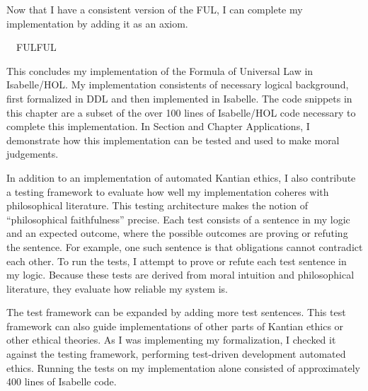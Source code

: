 \begin{isabellebody}
\begin{isamarkuptext}
Now that I have a consistent version of the FUL, I can complete my implementation by adding it as an axiom.%
\end{isamarkuptext}\isamarkuptrue%
\isamarkupfalse%
\ \ FUL{\isacharcolon}FUL%
\begin{isamarkuptext}%
This concludes my implementation of the Formula of Universal Law in Isabelle/HOL. My implementation
consistents of necessary logical background, first formalized in DDL and then implemented in Isabelle.
The code snippets in this chapter are a subset of the over 100 lines of Isabelle/HOL code necessary to
complete this implementation. In Section  and Chapter Applications, I demonstrate how this
implementation can be tested and used to make moral judgements.%
\end{isamarkuptext}\isamarkuptrue%
%
\isadelimdocument
%
\endisadelimdocument
%
\isatagdocument
%
\isamarkuptrue%
%
\endisatagdocument
{\isafolddocument}%
%
\isadelimdocument
%
\endisadelimdocument
%
\begin{isamarkuptext}%
In addition to an implementation of automated Kantian ethics, I also contribute a testing framework 
to evaluate how well my implementation coheres with philosophical literature. This testing architecture 
makes the notion of ``philosophical faithfulness'' precise. Each test consists of a sentence in my logic 
and an expected outcome, where the possible outcomes are proving or refuting the sentence. For example, 
one such sentence is that obligations cannot contradict each other. To run the tests, I attempt to
 prove or refute each test sentence in my logic.  Because these tests are derived from moral 
intuition and philosophical literature, they evaluate how reliable my system is.

The test framework can be expanded by adding more test sentences. This test framework can also guide 
implementations of other parts of Kantian ethics or other ethical theories. As I was implementing my 
formalization, I checked it against the testing framework, performing test-driven development automated 
ethics. Running the tests on my implementation alone consisted of approximately 400 lines of Isabelle code.


\end{isamarkuptext}
\end{isabellebody}
